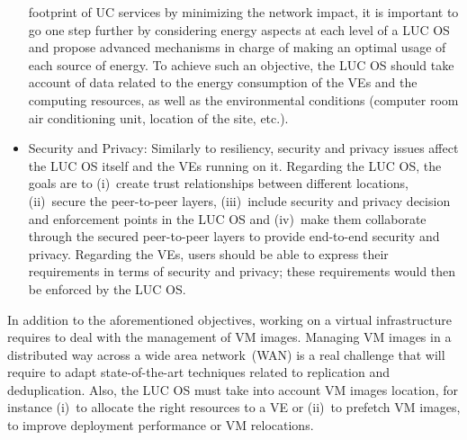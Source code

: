\begin{itemize}
footprint of UC services by minimizing the network impact, 
it is important to go one
step further by considering energy aspects at each level of a LUC OS
and propose advanced mechanisms in charge of making an optimal usage of each source of energy. 
 To achieve such an objective, the LUC OS should take account of data related to the energy
  consumption of the VEs  and the computing resources,
  as well as the environmental conditions (computer room air conditioning unit, location of the
  site, etc.).
\item Security and Privacy: Similarly to resiliency, security and privacy issues affect the LUC OS itself and the VEs running on it.
Regarding the LUC OS, the goals are to (i)~create trust relationships between
different locations, (ii)~secure the peer-to-peer layers, 
(iii)~include security and privacy decision and enforcement points in the LUC OS and (iv)~make them collaborate through the secured peer-to-peer layers to provide end-to-end security and privacy. 
Regarding the VEs, users should be able to express their requirements in terms of security and privacy; these requirements would then be enforced by the LUC OS.


\end{itemize}

In addition to the aforementioned objectives, working on a virtual infrastructure 
requires to deal with
the management of VM images. Managing VM images in a distributed
way across a wide area network~(WAN) is a real challenge that will require to adapt
state-of-the-art techniques related to replication and deduplication. Also,
the LUC OS must take into account VM images
location, for instance (i)~to allocate the right resources to a VE  or (ii)~to prefetch
VM images, to improve deployment performance or VM relocations.

